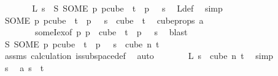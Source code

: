 \begin{isabellebody}
\ \ \ \ \isamarkupfalse%
\ \isamarkupfalse%
\ {\isachardoublequoteopen}L\ s\ {\isacharequal}{\kern0pt}\ S\ {\isacharparenleft}{\kern0pt}SOME\ p{\isachardot}{\kern0pt}\ p{\isasymin}cube\ {}\ t\ {\isasymand}\ p\ {}\ {\isacharequal}{\kern0pt}\ s{\isacharparenright}{\kern0pt}{\isachardoublequoteclose}\ \isamarkupfalse%
\ L{\isacharunderscore}{\kern0pt}def\ \isamarkupfalse%
\ simp\isanewline
\ \ \ \ \isamarkupfalse%
\ \isamarkupfalse%
\ {\isachardoublequoteopen}{\isacharparenleft}{\kern0pt}SOME\ p{\isachardot}{\kern0pt}\ p{\isasymin}cube\ {}\ t\ {\isasymand}\ p\ {}\ {\isacharequal}{\kern0pt}\ s{\isacharparenright}{\kern0pt}\ {\isasymin}\ cube\ {}\ t{\isachardoublequoteclose}\ \isamarkupfalse%
\ cube{\isacharunderscore}{\kern0pt}props{\isacharparenleft}{\kern0pt}{}{\isacharparenright}{\kern0pt}\ a\isanewline
\ \ \ \ \ \ \ \ someI{\isacharunderscore}{\kern0pt}ex{\isacharbrackleft}{\kern0pt}of\ {\isachardoublequoteopen}{\isasymlambda}p{\isachardot}{\kern0pt}\ p\ {\isasymin}\ cube\ {}\ t\ {\isasymand}\ p\ {}\ {\isacharequal}{\kern0pt}\ s{\isachardoublequoteclose}{\isacharbrackright}{\kern0pt}\ \isamarkupfalse%
\ blast\isanewline
\ \ \ \ \isamarkupfalse%
\ \isamarkupfalse%
\ {\isachardoublequoteopen}S\ {\isacharparenleft}{\kern0pt}SOME\ p{\isachardot}{\kern0pt}\ p{\isasymin}cube\ {}\ t\ {\isasymand}\ p\ {}\ {\isacharequal}{\kern0pt}\ s{\isacharparenright}{\kern0pt}\ {\isasymin}\ cube\ n\ t{\isachardoublequoteclose}\isanewline
\ \ \ \ \ \ \isamarkupfalse%
\ assms{\isacharparenleft}{\kern0pt}{}{\isacharparenright}{\kern0pt}\ calculation{\isacharparenleft}{\kern0pt}{}{\isacharparenright}{\kern0pt}\ is{\isacharunderscore}{\kern0pt}subspace{\isacharunderscore}{\kern0pt}def\ \isamarkupfalse%
\ auto\isanewline
\ \ \ \ \isamarkupfalse%
\ \isamarkupfalse%
\ {\isachardoublequoteopen}L\ s\ {\isasymin}\ cube\ n\ t{\isachardoublequoteclose}\ \isamarkupfalse%
\ simp\isanewline
\ \ \isamarkupfalse%
\isanewline
\ \ \ \ \isamarkupfalse%
\ s\ \isamarkupfalse%
\ a{\isacharcolon}{\kern0pt}\ {\isachardoublequoteopen}s\ {\isasymnotin}\ {\isacharbraceleft}{\kern0pt}{\isachardot}{\kern0pt}{\isachardot}{\kern0pt}{\isacharless}{\kern0pt}t{\isacharbraceright}{\kern0pt}{\isachardoublequoteclose}\isanewline

\end{isabellebody}
